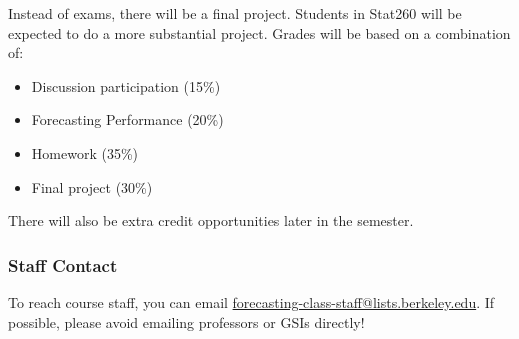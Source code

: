 \documentclass[11pt]{article}
\begin{document}
Instead of exams, there will be a final project. Students in Stat260 will be expected to do a more substantial project. %
%
Grades will be based on a combination of:
\begin{itemize} 
\item Discussion participation (15\%)
\item Forecasting Performance (20\%)
\item Homework (35\%)
\item Final project (30\%)
\end{itemize}

There will also be extra credit opportunities later in the semester.

\subsubsection*{Staff Contact}

To reach course staff, you can email \url{forecasting-class-staff@lists.berkeley.edu}. If possible, please avoid emailing professors or GSIs directly!
\end{document}
